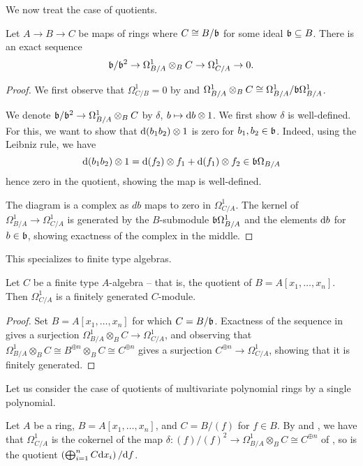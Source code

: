 We now treat the case of quotients. 
\begin{proposition}\label{prop: ideal exact sequence}
    Let $A\to B\to C$ be maps of rings where $C\cong B/\mathfrak{b}$ for some ideal $\mathfrak{b}\subseteq B$. There is an exact sequence 
    $$\mathfrak{b}/\mathfrak{b}^{2}\to\Omega_{B/A}^{1}\otimes_{B}C\to\Omega_{C/A}^{1}\to0.$$
\end{proposition}
\begin{proof}
    We first observe that $\Omega^{1}_{C/B}=0$ by  and $\Omega^{1}_{B/A}\otimes_{B}C\cong\Omega_{B/A}^{1}/\mathfrak{b}\Omega^{1}_{B/A}$. 
    
    We denote $\mathfrak{b}/\mathfrak{b}^{2}\to\Omega^{1}_{B/A}\otimes_{B}C$ by $\delta$, $b\mapsto \mathrm{d} b\otimes 1$. We first show $\delta$ is well-defined. For this, we want to show that $\mathrm{d}(b_{1}b_{2})\otimes 1$ is zero for $b_{1},b_{2}\in\mathfrak{b}$. Indeed, using the Leibniz rule, we have 
    $$\mathrm{d}(b_{1}b_{2})\otimes 1 = \mathrm{d}(f_{2})\otimes f_{1}+\mathrm{d}(f_{1})\otimes f_{2}\in\mathfrak{b}\Omega_{B/A}$$
    hence zero in the quotient, showing the map is well-defined. 
    
    The diagram is a complex as $db$ maps to zero in $\Omega^{1}_{C/A}$. The kernel of $\Omega^{1}_{B/A}\to\Omega^{1}_{C/A}$ is generated by the $B$-submodule $\mathfrak{b}\Omega_{B/A}^{1}$ and the elements $\mathrm{d} b$ for $b\in\mathfrak{b}$, showing exactness of the complex in the middle. 
\end{proof}
This specializes to finite type algebras. 
\begin{corollary}\label{corr: kahler differentials are fg module}
    Let $C$ be a finite type $A$-algebra -- that is, the quotient of $B=A[x_{1},\dots,x_{n}]$. Then $\Omega^{1}_{C/A}$ is a finitely generated $C$-module. 
\end{corollary}
\begin{proof}
    Set $B=A[x_{1},\dots,x_{n}]$ for which $C=B/\mathfrak{b}$. Exactness of the sequence in  gives a surjection $\Omega_{B/A}^{1}\otimes_{B}C\to\Omega_{C/A}^{1}$, and observing that $\Omega^{1}_{B/A}\otimes_{B}C\cong B^{\oplus n}\otimes_{B}C\cong C^{\oplus n}$ gives a surjection $C^{\oplus n}\to\Omega_{C/A}^{1}$, showing that it is finitely generated. 
\end{proof}
Let us consider the case of quotients of multivariate polynomial rings by a single polynomial. 
\begin{example}
    Let $A$ be a ring, $B=A[x_{1},\dots,x_{n}]$, and $C=B/(f)$ for $f\in B$. By  and , we have that $\Omega_{C/A}^{1}$ is the cokernel of the map $\delta:(f)/(f)^{2}\to\Omega_{B/A}^{1}\otimes_{B}C\cong C^{\oplus n}$ of , so is the quotient $\left(\bigoplus_{i=1}^{n}C\mathrm{d} x_{i}\right)/\mathrm{d} f$. 
\end{example}
